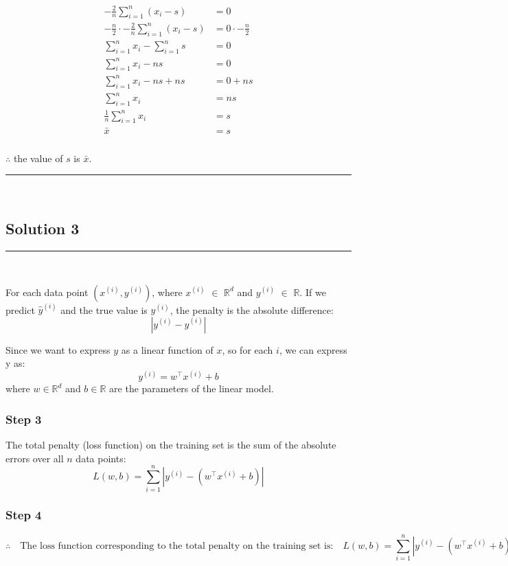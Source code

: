 \documentclass{article}
\begin{document}
\begin{align}
-\frac{2}{n} \sum_{i=1}^{n} (x_i - s) &= 0 \\
-\frac{n}{2} \cdot -\frac{2}{n} \sum_{i=1}^{n} (x_i - s) &= 0 \cdot -\frac{n}{2} \\
\sum_{i=1}^{n} x_i - \sum_{i=1}^{n} s &= 0 \\
\sum_{i=1}^{n} x_i - ns &= 0 \\
\sum_{i=1}^{n} x_i - ns + ns &= 0 + ns \\
\sum_{i=1}^{n} x_i &= ns \\
\frac {1}{n}\sum_{i=1}^{n} x_i &= s \\
\bar{x} &= s
\end{align} 


\subsubsection*{\normalfont}{$\therefore$ the value of $s$ is $\bar{x}$.}

\noindent\rule{\textwidth}{0.4pt}\\

\newpage


\subsection*{Solution 3}
\noindent\rule{\textwidth}{0.4pt}\\

\parbox{\textwidth}{
For each data point $(x^{(i)}, y^{(i)})$, where $x^{(i)}$ $\in$ $\mathbb{R}^d$ and $y^{(i)}$ $\in$ $\mathbb{R}$. If we predict $\hat{y}^{(i)}$ and the true value is $y^{(i)}$, the penalty is the absolute difference:
\[
|y^{(i)} - \hat{y}^{(i)}|
\]
}

\parbox{\textwidth}{
Since we want to express $y$ as a linear function of $x$, so for each $i$, we can express y as:
\[
{y}^{(i)} = w^\top x^{(i)} + b
\]
where $w \in \mathbb{R}^d$ and $b \in \mathbb{R}$ are the parameters of the linear model.
}

\subsubsection*{Step 3}
\parbox{\textwidth}{
The total penalty (loss function) on the training set is the sum of the absolute errors over all $n$ data points:
\[
L(w, b) = \sum_{i=1}^n \left| y^{(i)} - (w^\top x^{(i)} + b) \right|
\]
}

\subsubsection*{Step 4}
\parbox{\textwidth}{
\[
\therefore \quad \text{The loss function corresponding to the total penalty on the training set is:} \quad L(w, b) = \sum_{i=1}^n \left| y^{(i)} - (w^\top x^{(i)} + b) \right|
\]
}
\end{document}
